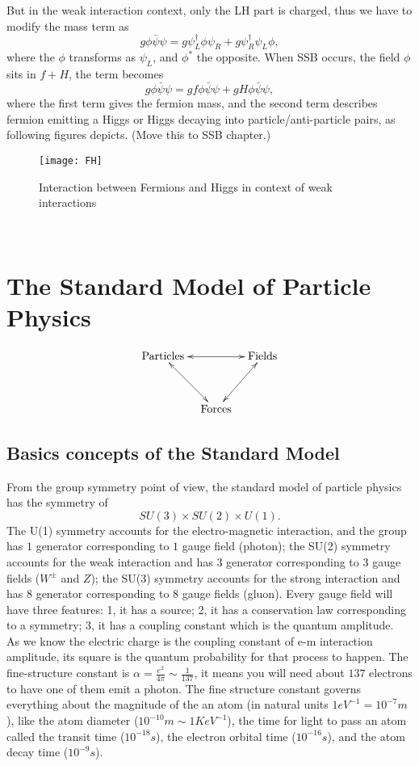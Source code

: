 \documentclass{article}
\newcommand{\subsec}{\subsection}
\newcommand{\be}{\begin{equation}}
\newcommand{\ee}{\end{equation}}
\renewcommand{\1}{\left}
\renewcommand{\2}{\right}
\newcommand{\al}{\alpha}
\begin{document}
But in the weak interaction context, only the LH part is charged, thus we have to modify the mass term as 
\be
g\phi\bar\psi\psi=g\psi_L^\dag\phi\psi_R+g\psi_R^\dag\psi_L\phi,
\ee
where the $\phi$ transforms as $\psi_L$, and $\phi^*$ the opposite. When SSB occurs, the field $\phi$ sits in $f+H$, the term becomes
\be
g\phi\bar\psi\psi=gf\phi\bar\psi\psi+gH\phi\bar\psi\psi,
\ee
where the first term gives the fermion mass, and the second term describes fermion emitting a Higgs or Higgs decaying into particle/anti-particle pairs, as following figures depicts. (Move this to SSB chapter.)
\begin{figure}[h]
\centering
\texttt{[image: FH]}
\caption{Interaction between Fermions and Higgs in context of weak interactions}
\end{figure}\\












\newpage
\section{The Standard Model of Particle Physics}
\be
\begin{gathered} \xymatrix@R=8ex@C=2ex{
\text{Particles} \ar@{<->}[rd] \ar@{<->}[rr]& &\text{Fields} \ar@{<->}[ld] \\
&\text{Forces}& \\
} \end{gathered}
\ee

\subsec{Basics concepts of the Standard Model}
From the group symmetry point of view, the standard model of particle physics has the symmetry of \be SU(3)\times SU(2) \times U(1).\ee The U(1) symmetry accounts for the electro-magnetic interaction, and the group has $1$ generator corresponding to $1$ gauge field (photon); the SU(2) symmetry accounts for the weak interaction and has $3$ generator corresponding to $3$ gauge fields ($W^\pm$ and $Z$); the SU(3) symmetry accounts for the strong interaction and has $8$ generator corresponding to $8$ gauge fields (gluon). Every gauge field will have three features: 1, it has a source; 2, it has a conservation law corresponding to a symmetry; 3, it has a coupling constant which is the quantum amplitude.\\

As we know the electric charge is the coupling constant of e-m interaction amplitude, its square is the quantum probability for that process to happen. The fine-structure constant is $\al=\frac{e^2}{4\pi}\sim \frac 1{137}$, it means you will need about $137$ electrons to have one of them emit a photon. The fine structure constant governs everything about the magnitude of the an atom (in natural units $1eV^{-1}=10^{-7}m$), like the atom diameter ($10^{-10}m\sim 1KeV^{-1}$), the time for light to pass an atom called the transit time ($10^{-18}s$), the electron orbital time ($10^{-16}s$), and the atom decay time ($10^{-9}s$).\\
\end{document}
